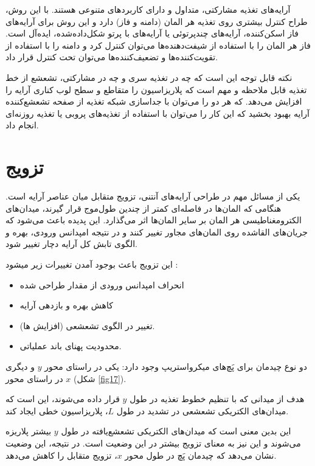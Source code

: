 آرایه‌های تغذیه مشارکتی، متداول و دارای کاربردهای متنوعی هستند. با این روش، طراح کنترل بیشتری روی تغذیه هر المان (دامنه و فاز) دارد و این روش برای آرایه‌های فاز اسکن‌کننده، آرایه‌های چندپرتوئی یا آرایه‌های با پرتو شکل‌داده‌شده، ایده‌آل است. فاز هر المان را با استفاده از شیفت‌دهنده‌ها می‌توان کنترل کرد و دامنه را با استفاده از تقویت‌کننده‌ها و تضعیف‌کننده‌ها می‌توان تحت کنترل قرار داد.


نکته قابل توجه این است که چه در تغذیه سری و چه در مشارکتی، تشعشع از خط تغذیه قابل ملاحظه و مهم است که پلاریزاسیون را متقاطع و سطح لوب کناری آرایه را افزایش می‌دهد. که هر دو را می‌توان با جداسازی شبکه تغذیه از صفحه تشعشع‌کننده آرایه بهبود بخشید که این کار را می‌توان با استفاده از تغذیه‌های پروبی یا تغذیه روزنه‌ای انجام داد.


\section{تزویج}
یکی از مسائل مهم در طراحی آرایه‌های آنتنی، تزویج متقابل میان عناصر آرایه است. هنگامی که المان‌ها در فاصله‌ای کمتر از چندین طول‌موج قرار گیرند، میدان‌های الکترومغناطیسی هر المان بر سایر المان‌ها اثر می‌گذارد. این پدیده باعث می‌شود که جریان‌های القاشده روی المان‌های مجاور تغییر کنند و در نتیجه امپدانس ورودی، بهره و الگوی تابش کل آرایه دچار تغییر شود.


این تزویج باعث بوجود آمدن تغییرات زیر میشود : 

\begin{itemize}
	\item{
	انحراف امپدانس ورودی از مقدار طراحی شده
	} 
	\item{
	کاهش بهره و بازدهی آرایه
	}
	\item{
	تغییر در الگوی تشعشعی (افزایش
	ها).
	}
	\item{
	محدودیت پهنای باند عملیاتی.
	}
\end{itemize}

دو نوع چیدمان برای پَچ‌های میکرواستریپ وجود دارد: یکی در راستای محور
$ y$
 و دیگری در راستای محور
 $ x$
 (شکل
 \ref{fig17}).

هدف از میدانی که با تنظیم خطوط تغذیه در طول
$ y$
 قرار داده می‌شوند، این است که میدان‌های الکتریکی تشعشعی در تشدید در طول
 $ L$،
  پلاریزاسیون خطی ایجاد کند. 


این بدین معنی است که میدان‌های الکتریکی تشعشع‌یافته در طول
$ y$
 بیشتر پلاریزه می‌شوند و این نیز به معنای تزویج بیشتر در این وضعیت است. در نتیجه، این وضعیت نشان می‌دهد که چیدمان پَچ در طول محور
 $ x$،
  تزویج متقابل
 را کاهش می‌دهد.
 
